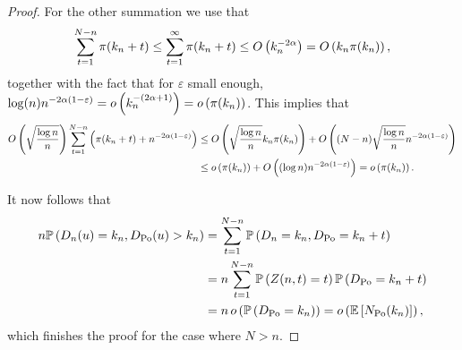 \begin{proof}
For the other summation we use that
\[
	\sum_{t = 1}^{N-n} {\pi}(k_n + t) \le \sum_{t = 1}^\infty {\pi}(k_n + t)
	\le O\left(k_n^{-2\alpha}\right) = O\left(k_n {\pi}(k_n)\right),
\]
together with the fact that for $\varepsilon$ small enough, $\log(n) n^{-2\alpha(1-\varepsilon)} = o\left(k_n^{-(2\alpha + 1)}\right) = o\left({\pi}(k_n)\right)$. This implies that
\begin{align*}
	O\left(\sqrt{\frac{\log n}{n}}\right) \sum_{t = 1}^{N-n}
		\left({\pi}(k_n + t) + n^{-2\alpha(1-\varepsilon)}\right)
	&\le O\left(\sqrt{\frac{\log n}{n}} k_n {\pi}(k_n)\right) + O\left((N-n)\sqrt{\frac{\log n}{n}} n^{-2\alpha(1-\varepsilon)}\right)\\
	&\le o\left({\pi}(k_n)\right) + O\left((\log n) n^{-2\alpha(1-\varepsilon)}\right) = o\left({\pi}(k_n)\right).
\end{align*}

It now follows that
\begin{align*}
	n \mathbb{P}\left(D_n(u) = k_n, D_{{\mathrm{Po}}}(u) > k_n\right)
	&= \sum_{t = 1}^{N-n} \mathbb{P}\left(D_n = k_n, D_{{\mathrm{Po}}} = k_n + t\right)\\
	&= n \sum_{t = 1}^{N-n} \mathbb{P}\left(Z(n,t) = t\right)\mathbb{P}\left(D_{{\mathrm{Po}}} = k_n + t\right)\\
	&= n \, o\left(\mathbb{P}\left(D_{{\mathrm{Po}}} = k_n\right)\right) = o\left(\mathbb{E}\left[N_{{\mathrm{Po}}}(k_n)\right]\right),
\end{align*}
which finishes the proof for the case where $N > n$.
\end{proof}

